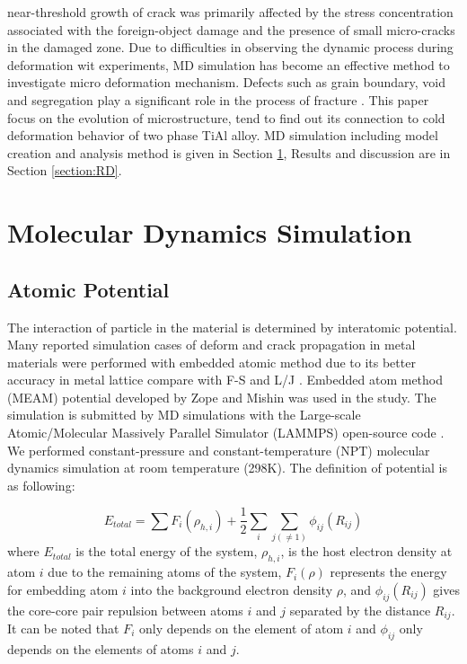 \documentclass[Unknown,article,submit,moreauthors,pdftex,10pt,a4paper]{Definitions/mdpi}
\begin{document}
near-threshold growth of crack was primarily affected by the stress concentration associated with the foreign-object damage and the presence of small micro-cracks in the damaged zone. Due to difficulties in observing the dynamic process during deformation wit experiments, MD simulation has become an effective method to investigate micro deformation mechanism. Defects such as grain boundary, void and segregation play a significant role in the process of fracture \cite{Larsen2016}. This paper focus on the evolution of microstructure, tend to find out its connection to cold deformation behavior of two phase TiAl alloy. MD simulation including model creation and analysis method is given in Section \ref{section:method}, Results and discussion are in Section \ref{section:RD}.

\section{Molecular Dynamics Simulation }\label{section:method}
\subsection{Atomic Potential}

The interaction of particle in the material is determined by interatomic potential. Many reported simulation cases of deform and crack propagation in metal materials were performed with embedded atomic method due to its better accuracy in metal lattice compare with F-S and L/J \cite{Ko2015,Zepeda-Ruiz2017,Fan2018a}. Embedded atom method (MEAM) potential developed by Zope and Mishin \cite{Zope2003} was used in the study. The simulation is submitted by MD simulations with the Large-scale Atomic/Molecular Massively Parallel Simulator (LAMMPS) open-source code \cite{Plimpton1995}. We performed constant-pressure and constant-temperature (NPT) molecular dynamics simulation at room temperature (298K). The definition of potential is as following:
	
\begin{equation} \label{eq:eam} 
E_{total}= \displaystyle\sum F_i(\rho_{h,i})+\frac{1}{2}\sum_i\sum_{j(\neq1)}\phi_{ij}(R_{ij})
\end{equation}
where $E_{total}$ is the total energy of the system, $\rho_{h,i}$, is the host electron density at atom $i$ due to the remaining atoms of the system, $F_i(\rho)$ represents the energy for embedding atom $i$ into the background electron density $\rho$, and $\phi_{ij}(R_{ij})$ gives the core-core pair repulsion between atoms $i$ and $j$ separated by the distance $R_{ij}$. It can be noted that $F_i$ only depends on the element of atom $i$ and $\phi_{ij}$ only depends on the elements of atoms $i$ and $j$. 
\end{document}
